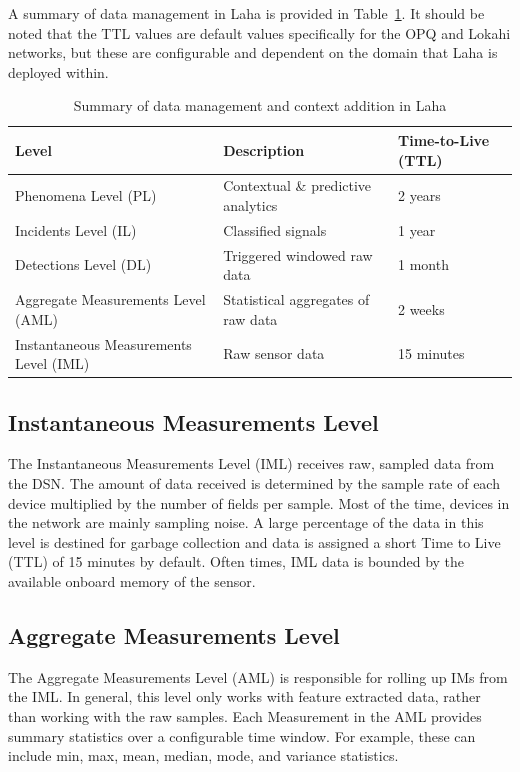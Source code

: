 A summary of data management in Laha is provided in Table~\ref{data-managament-table}. It should be noted that the TTL values are default values specifically for the OPQ and Lokahi networks, but these are configurable and dependent on the domain that Laha is deployed within.

\begin{table}[h]
	\centering
	\begin{tabularx}{\textwidth}{lXl}
		\toprule
		\textbf{Level} & \textbf{Description} & \textbf{Time-to-Live (TTL)} \\
		\midrule
		Phenomena Level (PL) & Contextual \& predictive analytics & 2 years \\
		Incidents Level (IL) & Classified signals & 1 year \\
		Detections Level (DL) & Triggered windowed raw data & 1 month  \\
		Aggregate Measurements Level (AML) & Statistical aggregates of raw data  & 2 weeks  \\
		Instantaneous Measurements Level (IML) & Raw sensor data  & 15 minutes \\
		\bottomrule
	\end{tabularx}
	\caption{Summary of data management and context addition in Laha}
	\label{data-managament-table}
\end{table}

\subsection{Instantaneous Measurements Level}\label{subsec:instantaneous-measurements-level}
The Instantaneous Measurements Level (IML) receives raw, sampled data from the DSN. The amount of data received is determined by the sample rate of each device multiplied by the number of fields per sample. Most of the time, devices in the network are mainly sampling noise. A large percentage of the data in this level is destined for garbage collection and data is assigned a short Time to Live (TTL) of 15 minutes by default. Often times, IML data is bounded by the available onboard memory of the sensor.

\subsection{Aggregate Measurements Level}\label{subsec:aggregate-measurements-level}
The Aggregate Measurements Level (AML) is responsible for rolling up IMs from the IML. In general, this level only works with feature extracted data, rather than working with the raw samples. Each Measurement in the AML provides summary statistics over a configurable time window. For example, these can include min, max, mean, median, mode, and variance statistics.

